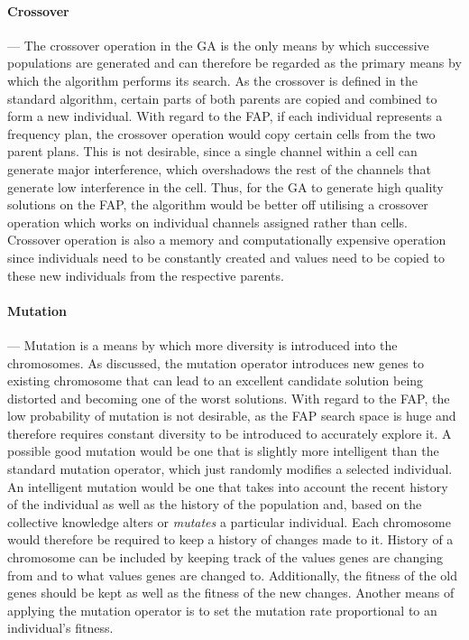 \paragraph{Crossover}
--- The crossover operation in the \gls{GA} is the only means by which successive populations are generated and can therefore be regarded as the primary means by which the algorithm performs its search. As the crossover is defined in the standard algorithm, certain parts of both parents are copied and combined to form a new individual. With regard to the \gls{FAP}, if each individual represents a frequency plan, the crossover operation would copy certain cells from the two parent plans. This is not desirable, since a single channel within a cell can generate major interference, which overshadows the rest of the channels that generate low interference in the cell. Thus, for the \gls{GA} to generate high quality solutions on the \gls{FAP}, the algorithm would be better off utilising a crossover operation which works on individual channels assigned rather than cells. Crossover operation is also a memory and computationally expensive operation since individuals need to be constantly created and values need to be copied to these new individuals from the respective parents.
\paragraph{Mutation}
--- Mutation is a means by which more diversity is introduced into the chromosomes.  As discussed, the mutation operator introduces new genes to existing chromosome that can lead to an excellent candidate solution being distorted and becoming one of the worst solutions. With regard to the \gls{FAP}, the low probability of mutation is not desirable, as the \gls{FAP} search space is huge and therefore requires constant diversity to be introduced to accurately explore it. A possible good mutation would be one that is slightly more intelligent than the standard mutation operator, which just randomly modifies a selected individual. An intelligent mutation would be one that takes into account the recent history of the individual as well as the history of the population and, based on the collective knowledge alters or \emph{mutates} a particular individual. Each chromosome would therefore be required to keep a history of changes made to it. History of a chromosome can be included by keeping track of the values genes are changing from and to what values genes are changed to. Additionally, the fitness of the old genes should be kept as well as the fitness of the new changes. Another means of applying the mutation operator is to set the mutation rate proportional to an individual's fitness.
